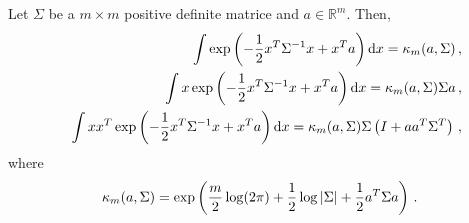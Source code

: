 \begin{lemma}
Let $\Sigma$ be a $m\times m$ positive definite matrice and $a\in\mathbb{R}^m$. Then,
\begin{eqnarray*}
&&\int \exp \left(-\frac{1}{2} x^T \Sigma^{-1} x + x^T a \right) \mathrm{d} x = \kappa_m(a,\Sigma)\,, \\
&&\int x \exp \left(-\frac{1}{2} x^T \Sigma^{-1} x + x^T a \right) \mathrm{d} x = \kappa_m(a,\Sigma)\Sigma a\,, \\
&&\int x x^T \exp\left( -\frac{1}{2}x^T \Sigma^{-1} x + x^T a \right) \mathrm{d} x = \kappa_m(a,\Sigma)\Sigma \left( I+ a a^T \Sigma^T \right) \,,
\end{eqnarray*}
where
\[
\kappa_m(a,\Sigma) = \exp \left( \frac{m}{2} \log (2\pi) + \frac{1}{2}\log |\Sigma|+\frac{1}{2}a^T \Sigma a \right)\,.
\]
\end{lemma}

%
%
%
